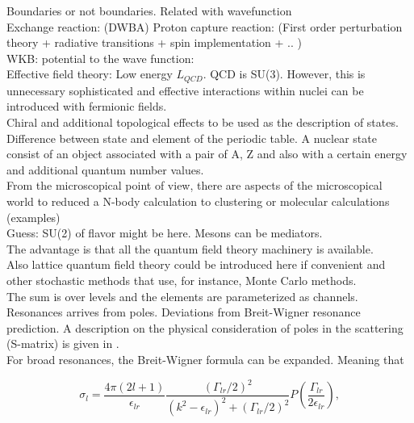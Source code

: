\documentclass[openany]{book}
\begin{document}
Boundaries or not boundaries. Related with wavefunction  \\

Exchange reaction: (DWBA)
Proton capture reaction: (First order perturbation theory + radiative transitions + spin implementation + .. ) \\

WKB: potential to the wave function: \\

Effective field theory: Low energy $L_{QCD}$. 
QCD is SU(3). However, this is unnecessary sophisticated and effective interactions within nuclei can be introduced with fermionic fields.  \\

Chiral and additional topological effects to be used as the description of states. \\
 
Difference between state and element of the periodic table. A nuclear state consist of an object associated with a pair of A, Z and also  with a certain energy and additional quantum number values. \\

From the microscopical point of view, there are aspects of the microscopical world to reduced a N-body calculation to  clustering or molecular calculations (examples) \\

Guess: SU(2) of flavor might be here. Mesons can be mediators. \\

The advantage is that all the quantum field theory machinery is available. \\

Also lattice quantum field theory could be introduced here if convenient and other stochastic methods that use, for instance, Monte Carlo methods. \\

The sum is over levels and the elements are parameterized as channels.  \\

Resonances arrives from poles. Deviations from Breit-Wigner resonance prediction. A description on the physical consideration of poles in the scattering (S-matrix) is given in \cite{ramirezjimenez_kelkar_2018}. \\

For broad resonances, the Breit-Wigner formula can be expanded. Meaning that 

\begin{equation}\label{eq:rmatrix_generalizedBW}
	\sigma_l = \frac{4\pi(2l+1)}{\epsilon_{lr}} \frac{(\Gamma_{lr}/2 )^2}{(k^2 - \epsilon_{lr})^2 + (\Gamma_{lr}/2)^2} P \left(\frac{\Gamma_{lr}}{2\epsilon_{lr}}\right),
\end{equation}
\end{document}
